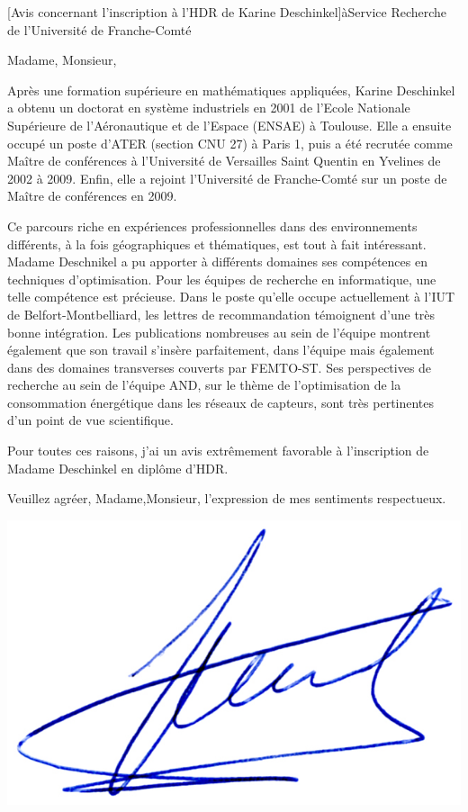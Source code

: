 \documentclass[a4paper,10pt]{article}
\begin{document}

\begin{letter}[Avis concernant l'inscription à l'HDR de Karine Deschinkel]{à}{Service Recherche de l'Université de Franche-Comté}

Madame, Monsieur,

Après une formation supérieure en mathématiques appliquées,
Karine Deschinkel a obtenu un doctorat en système industriels en 2001 de 
l'Ecole Nationale Supérieure de l'Aéronautique et de l'Espace (ENSAE) à Toulouse.
Elle a ensuite occupé un poste d'ATER (section CNU 27) à Paris 1, puis a été recrutée
comme Maître de conférences à l'Université de Versailles Saint Quentin en Yvelines
de 2002 à 2009. Enfin, elle a rejoint l'Université de Franche-Comté sur un poste de 
Maître de conférences en 2009.

Ce parcours riche en expériences professionnelles dans des environnements différents,
à la fois géographiques et thématiques, est tout à fait intéressant. Madame Deschnikel
a pu apporter à différents domaines ses compétences en techniques d'optimisation.
Pour les équipes de recherche en informatique, une telle compétence est précieuse.
Dans le poste qu'elle occupe actuellement à l'IUT de Belfort-Montbelliard, les lettres 
de recommandation témoignent d'une très bonne intégration. Les publications nombreuses
au sein de l'équipe montrent également que son travail s'insère parfaitement, dans l'équipe
mais également dans des domaines transverses couverts par FEMTO-ST.
Ses perspectives de recherche au sein de l'équipe AND, sur le thème de l'optimisation de 
la consommation énergétique dans les réseaux de capteurs, sont très pertinentes d'un point 
de vue scientifique. 


Pour toutes ces raisons, j'ai un avis extrêmement favorable à l'inscription de Madame  
Deschinkel en diplôme d'HDR.


Veuillez agréer, Madame,Monsieur, l'expression de mes sentiments respectueux.

\end{letter}
\begin{flushright}
\includegraphics[width=.26\textwidth]{signgenaud.jpg}
\end{flushright}
\end{document}

